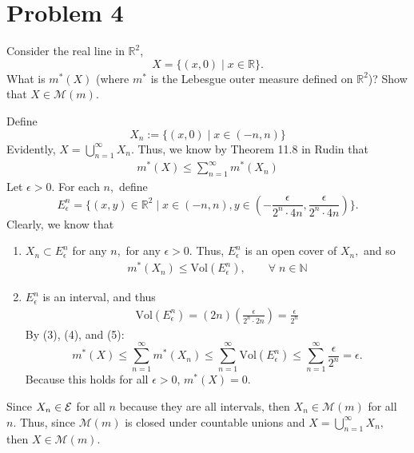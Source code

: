 \documentclass[11pt]{article}
\newcommand{\Vol}{\text{Vol}}
\newcommand{\bbN}{\mathbb{N}}
\newcommand{\bbR}{\mathbb{R}}
\begin{document}
\section*{Problem 4}
\begin{problem}
    Consider the real line in $\mathbb{R}^2$, 
\[
X = \{(x,0) \mid x \in \mathbb{R}\}.
\]
What is $m^*(X)$ (where $m^*$ is the Lebesgue outer measure defined on $\mathbb{R}^2$)? Show that $X \in \mathcal{M}(m)$.
\end{problem}
\begin{solution}
Define 
\[X_n := \{(x,0) \mid x \in (-n, n)\}\]
Evidently, $X = \bigcup_{n=1}^\infty X_n.$ Thus, we know by Theorem 11.8 in Rudin that
\begin{align}
m^*(X) \leq \sum_{n=1}^\infty m^*(X_n)    
\end{align}
Let $\epsilon>0.$ For each $n,$ define 
\[E_\epsilon^n = \{(x,y) \in \bbR^2 \mid x \in (-n, n), y \in (-\frac{\epsilon}{2^n \cdot 4n}, \frac{\epsilon}{2^n \cdot 4n})\}.\] Clearly, we know that 
\begin{enumerate}
    \item $X_n \subset E_\epsilon^n$ for any $n,$ for any $\epsilon>0.$ Thus, $E_\epsilon^n$ is an open cover of $X_n,$ and so 
    \begin{align}
        m^*(X_n) \leq \Vol(E_\epsilon^n), \qquad \forall \;n \in \bbN
    \end{align}
    \item $E_\epsilon^n$ is an interval, and thus 
    \begin{align}\Vol(E_\epsilon^n) = (2n)(\frac{\epsilon}{2^n \cdot 2n}) = \frac{\epsilon}{2^n}    
    \end{align}
By (3), (4), and (5):
\[m^*(X) \leq \sum_{n=1}^\infty m^*(X_n)\leq \sum_{n=1}^\infty \Vol(E_\epsilon^n) \leq \sum_{n=1}^\infty \frac{\epsilon}{2^n} = \epsilon.\] Because this holds for all $\epsilon>0$, $m^*(X) = 0.$ 

\end{enumerate}
Since $X_n \in \cal E$ for all $n$ because they are all intervals, then $X_n \in \mathcal{M}(m)$ for all $n.$ Thus, since $\mathcal{M}(m)$ is closed under countable unions and $X = \bigcup_{n=1}^\infty X_n,$ then $X \in \mathcal{M}(m).$
\end{solution}

\newpage
\end{document}
